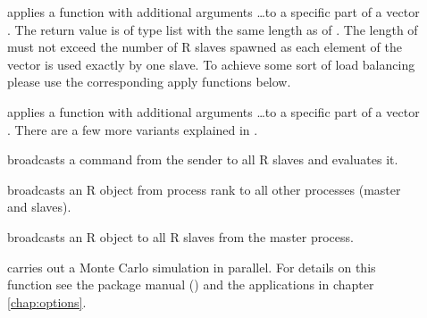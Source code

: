 \begin{description}
\item[] applies a function
   with additional arguments \ldots to a specific part of
  a vector . The return value is of type list with the same
  length as of . The length of
   must not exceed the 
  number of R slaves spawned as each element of the vector is used
  exactly by one slave. To achieve some sort of load balancing please
  use the corresponding apply functions below.
\item[] applies a function
   with additional arguments \ldots to a specific part of
  a vector . There are a few more variants explained in
  \cite{yu06Rmpi}.
\item[]
  broadcasts a command  from the sender  to
  all R slaves and evaluates it.
\item[]
  broadcasts an R object  from process rank 
  to all other processes (master and slaves).
\item[] broadcasts an R
  object  to all R slaves from the master process. 
\item[] carries out a Monte Carlo simulation
  in parallel. For details on this function see the package manual
  (\cite{yu06Rmpi}) and
  the applications in chapter \ref{chap:options}.
\end{description}


